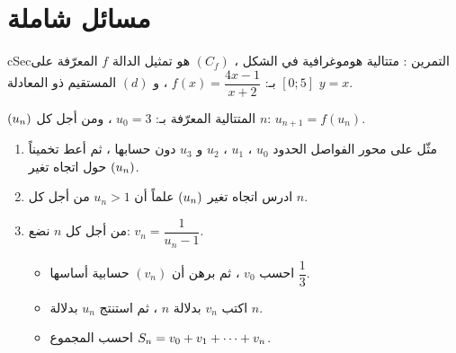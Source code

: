 \documentclass[12pt,a4paper]{article}
\newenvironment{BOX}[2]{\begin{otherlanguage}{english}\begin{arbox}{#1}{#2}}{\end{arbox}\end{otherlanguage}}
\newcounter{exo}
\newenvironment{tamrin}[1]{\stepcounter{exo}\begin{BOX}{cSec}{التمرين \theexo: #1}}{\end{BOX}}
\renewcommand{\cdots}{\mathinner{\cdotp\cdotp\cdotp}}
\newenvironment{sq}{\begin{itemize}[leftmargin=2.4em,itemsep=3pt]}{\end{itemize}}
\newcommand{\qa}{\item[(أ)]}\newcommand{\qb}{\item[(ب)]}\newcommand{\qc}{\item[(جـ)]}\newcommand{\qd}{\item[(د)]}\newcommand{\qe}{\item[(هـ)]}
\begin{document}
\section{مسائل شاملة}
\begin{tamrin}{متتالية هوموغرافية}
في الشكل ، $(C_f)$ هو تمثيل الدالة $f$ المعرّفة على $[0;5]$ بـ: $f(x)=\dfrac{4x-1}{x+2}$ ، و $(d)$ المستقيم ذو المعادلة $y=x$.\par
$(u_n)$ المتتالية المعرّفة بـ: $u_0=3$ ، ومن أجل كل $n$: $u_{n+1}=f(u_n)$.
\begin{enumerate}
\item مثّل على محور الفواصل الحدود $u_0$ ، $u_1$ ، $u_2$ و $u_3$ دون حسابها ، ثم أعط تخميناً حول اتجاه تغير $(u_n)$.
\item ادرس اتجاه تغير $(u_n)$ علماً أن $u_n>1$ من أجل كل $n$.
\item من أجل كل $n$ نضع: $v_n=\dfrac{1}{u_n-1}$.
\begin{sq}
\qa احسب $v_0$ ، ثم برهن أن $(v_n)$ حسابية أساسها $\dfrac13$.
\qb اكتب $v_n$ بدلالة $n$ ، ثم استنتج $u_n$ بدلالة $n$.
\qc احسب المجموع $S_n=v_0+v_1+\cdots+v_n$.
\end{sq}
\end{enumerate}
\end{tamrin}
\end{document}

